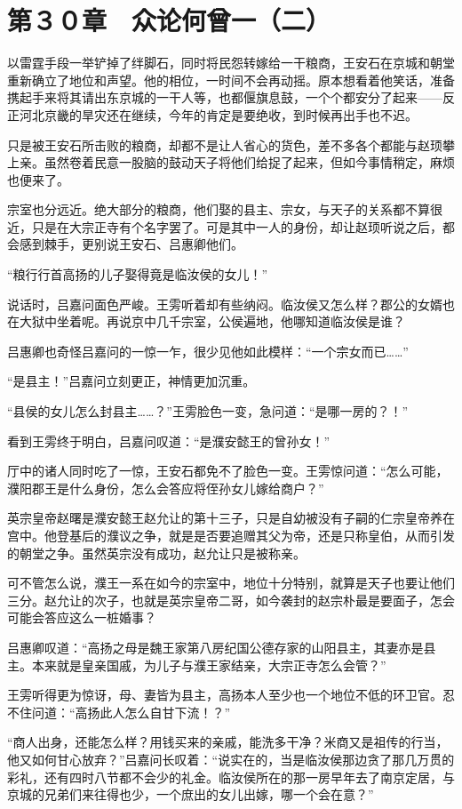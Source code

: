 \section{第３０章　众论何曾一（二）}

以雷霆手段一举铲掉了绊脚石，同时将民怨转嫁给一干粮商，王安石在京城和朝堂重新确立了地位和声望。他的相位，一时间不会再动摇。原本想看着他笑话，准备携起手来将其请出东京城的一干人等，也都偃旗息鼓，一个个都安分了起来——反正河北京畿的旱灾还在继续，今年的肯定是要绝收，到时候再出手也不迟。

只是被王安石所击败的粮商，却都不是让人省心的货色，差不多各个都能与赵顼攀上亲。虽然卷着民意一股脑的鼓动天子将他们给捉了起来，但如今事情稍定，麻烦也便来了。

宗室也分远近。绝大部分的粮商，他们娶的县主、宗女，与天子的关系都不算很近，只是在大宗正寺有个名字罢了。可是其中一人的身份，却让赵顼听说之后，都会感到棘手，更别说王安石、吕惠卿他们。

“粮行行首高扬的儿子娶得竟是临汝侯的女儿！”

说话时，吕嘉问面色严峻。王雱听着却有些纳闷。临汝侯又怎么样？郡公的女婿也在大狱中坐着呢。再说京中几千宗室，公侯遍地，他哪知道临汝侯是谁？

吕惠卿也奇怪吕嘉问的一惊一乍，很少见他如此模样：“一个宗女而已……”

“是县主！”吕嘉问立刻更正，神情更加沉重。

“县侯的女儿怎么封县主……？”王雱脸色一变，急问道：“是哪一房的？！”

看到王雱终于明白，吕嘉问叹道：“是濮安懿王的曾孙女！”

厅中的诸人同时吃了一惊，王安石都免不了脸色一变。王雱惊问道：“怎么可能，濮阳郡王是什么身份，怎么会答应将侄孙女儿嫁给商户？”

英宗皇帝赵曙是濮安懿王赵允让的第十三子，只是自幼被没有子嗣的仁宗皇帝养在宫中。他登基后的濮议之争，就是是否要追赠其父为帝，还是只称皇伯，从而引发的朝堂之争。虽然英宗没有成功，赵允让只是被称亲。

可不管怎么说，濮王一系在如今的宗室中，地位十分特别，就算是天子也要让他们三分。赵允让的次子，也就是英宗皇帝二哥，如今袭封的赵宗朴最是要面子，怎会可能会答应这么一桩婚事？

吕惠卿叹道：“高扬之母是魏王家第八房纪国公德存家的山阳县主，其妻亦是县主。本来就是皇亲国戚，为儿子与濮王家结亲，大宗正寺怎么会管？”

王雱听得更为惊讶，母、妻皆为县主，高扬本人至少也一个地位不低的环卫官。忍不住问道：“高扬此人怎么自甘下流！？”

“商人出身，还能怎么样？用钱买来的亲戚，能洗多干净？米商又是祖传的行当，他又如何甘心放弃？”吕嘉问长叹着：“说实在的，当是临汝侯那边贪了那几万贯的彩礼，还有四时八节都不会少的礼金。临汝侯所在的那一房早年去了南京定居，与京城的兄弟们来往得也少，一个庶出的女儿出嫁，哪一个会在意？”

